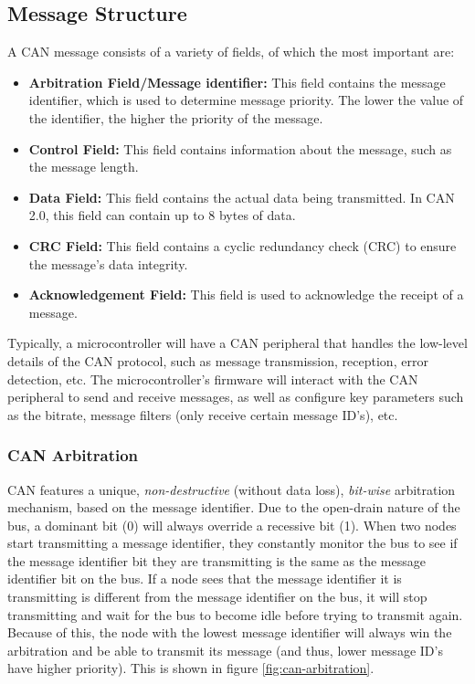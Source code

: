 \documentclass[main.tex]{subfiles}
\begin{document}
\subsection{Message Structure}
A CAN message consists of a variety of fields, of which the most important are:
\begin{itemize}
    \item \textbf{Arbitration Field/Message identifier:} This field contains the message identifier, which is used to determine message priority. The lower the value of the identifier, the higher the priority of the message.
    \item \textbf{Control Field:} This field contains information about the message, such as the message length.
    \item \textbf{Data Field:} This field contains the actual data being transmitted. In CAN 2.0, this field can contain up to 8 bytes of data.
    \item \textbf{CRC Field:} This field contains a cyclic redundancy check (CRC) to ensure the message's data integrity.
    \item \textbf{Acknowledgement Field:} This field is used to acknowledge the receipt of a message.
\end{itemize}

\noindent Typically, a microcontroller will have a CAN peripheral that handles the low-level details of the CAN protocol, such as message transmission, reception, error detection, etc. The microcontroller's firmware will interact with the CAN peripheral to send and receive messages, as well as configure key parameters such as the bitrate, message filters (only receive certain message ID's), etc.

\subsubsection{CAN Arbitration}
CAN features a unique, \textit{non-destructive} (without data loss), \textit{bit-wise} arbitration mechanism, based on the message identifier. Due to the open-drain nature of the bus, a dominant bit (0) will always override a recessive bit (1). When two nodes start transmitting a message identifier, they constantly monitor the bus to see if the message identifier bit they are transmitting is the same as the message identifier bit on the bus. If a node sees that the message identifier it is transmitting is different from the message identifier on the bus, it will stop transmitting and wait for the bus to become idle before trying to transmit again. Because of this, the node with the lowest message identifier will always win the arbitration and be able to transmit its message (and thus, lower message ID's have higher priority). This is shown in figure \ref{fig:can-arbitration}.
\end{document}
